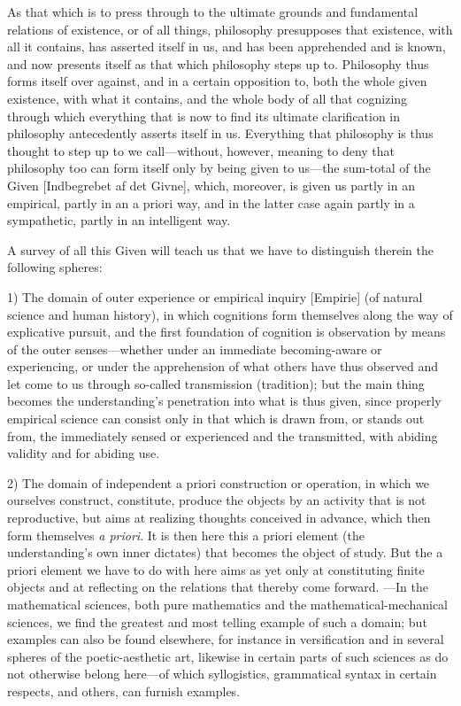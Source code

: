 \documentclass[12pt,a4paper]{book}
\begin{document}
As that which is to press through to the ultimate grounds and fundamental
relations of existence, or of all things, philosophy presupposes that existence,
with all it contains, has asserted itself in us, and has been apprehended and is
known, and now presents itself as that which philosophy steps up to. Philosophy
thus forms itself over against, and in a certain opposition to, both the whole
given existence, with what it contains, and the whole body of all that cognizing
through which everything that is now to find its ultimate clarification in
philosophy antecedently asserts itself in us. Everything that philosophy is thus
thought to step up to we call---without, however, meaning to deny that philosophy
too can form itself only by being given to us---the sum-total of the Given
[Indbegrebet af det Givne], which, moreover, is given us partly in an empirical,
partly in an a priori way, and in the latter case again partly in a sympathetic,
partly in an intelligent way.

A survey of all this Given will teach us that we have to distinguish therein the
following spheres:

1) The domain of outer experience or empirical inquiry [Empirie] (of natural
science and human history), in which cognitions form themselves along the way of
explicative pursuit, and the first foundation of cognition is observation by means
of the outer senses---whether under an immediate becoming-aware or experiencing,
or under the apprehension of what others have thus observed and let come to us
through so-called transmission (tradition); but the main thing becomes the
understanding's penetration into what is thus given, since properly empirical
science can consist only in that which is drawn from, or stands out from, the
immediately sensed or experienced and the transmitted, with abiding validity and
for abiding use.

2) The domain of independent a priori construction or operation, in which we
ourselves construct, constitute, produce the objects by an activity that is not
reproductive, but aims at realizing thoughts conceived in advance, which then form
themselves \textit{a priori}. It is then here this a priori element (the
understanding's own inner dictates) that becomes the object of study. But the a
priori element we have to do with here aims as yet only at constituting finite
objects and at reflecting on the relations that thereby come forward. ---In the
mathematical sciences, both pure mathematics and the mathematical-mechanical
sciences, we find the greatest and most telling example of such a domain; but
examples can also be found elsewhere, for instance in versification and in several
spheres of the poetic-aesthetic art, likewise in certain parts of such sciences as
do not otherwise belong here---of which syllogistics, grammatical syntax in
certain respects, and others, can furnish examples.
\end{document}
